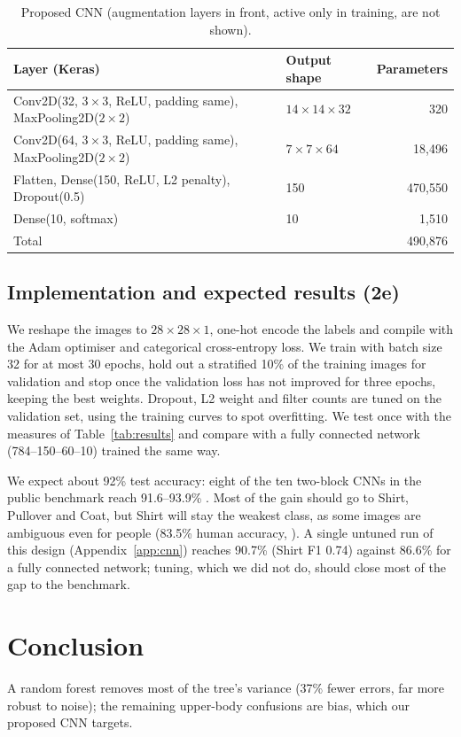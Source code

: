\documentclass[11pt,a4paper]{article}
\begin{document}
\begin{table}[h]
\centering
\small
\begin{tabular}{llr}
\toprule
Layer (Keras) & Output shape & Parameters \\
\midrule
Conv2D(32, $3\times3$, ReLU, padding same), MaxPooling2D($2\times2$) & $14\times14\times32$ & 320 \\
Conv2D(64, $3\times3$, ReLU, padding same), MaxPooling2D($2\times2$) & $7\times7\times64$ & 18{,}496 \\
Flatten, Dense(150, ReLU, L2 penalty), Dropout(0.5) & 150 & 470{,}550 \\
Dense(10, softmax) & 10 & 1{,}510 \\
\midrule
Total & & 490{,}876 \\
\bottomrule
\end{tabular}
\caption{Proposed CNN (augmentation layers in front, active only in training, are not shown).}
\label{tab:cnn}
\end{table}

\subsection{Implementation and expected results (2e)}
We reshape the images to $28\times28\times1$, one-hot encode the labels and compile with the Adam optimiser and categorical cross-entropy loss. We train with batch size 32 for at most 30 epochs, hold out a stratified 10\% of the training images for validation and stop once the validation loss has not improved for three epochs, keeping the best weights. Dropout, L2 weight and filter counts are tuned on the validation set, using the training curves to spot overfitting. We test once with the measures of Table~\ref{tab:results} and compare with a fully connected network (784--150--60--10) trained the same way.

We expect about 92\% test accuracy: eight of the ten two-block CNNs in the public benchmark reach 91.6--93.9\% \citep{fmnistbenchmark}. Most of the gain should go to Shirt, Pullover and Coat, but Shirt will stay the weakest class, as some images are ambiguous even for people (83.5\% human accuracy, \citealp{fmnistbenchmark}). A single untuned run of this design (Appendix~\ref{app:cnn}) reaches 90.7\% (Shirt F1 0.74) against 86.6\% for a fully connected network; tuning, which we did not do, should close most of the gap to the benchmark.

\section{Conclusion}
A random forest removes most of the tree's variance (37\% fewer errors, far more robust to noise); the remaining upper-body confusions are bias, which our proposed CNN targets.
\end{document}
